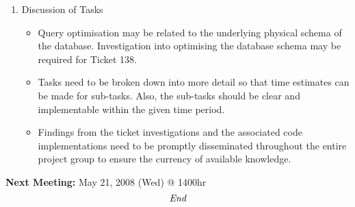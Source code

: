 \documentclass[10pt, a4]{article}
\begin{document}
\begin{enumerate}
\begin{itemize}
  \end{itemize}
\item Discussion of Tasks
  \begin{itemize}
  \item Query optimisation may be related to the underlying physical schema of the database. Investigation into optimising the database schema may be required for Ticket 138.
  \item Tasks need to be broken down into more detail so that time estimates can be made for sub-tasks. Also, the sub-tasks should be clear and implementable within the given time period.
  \item Findings from the ticket investigations and the associated code implementations need to be promptly disseminated throughout the entire project group to ensure the currency of available knowledge.
  \end{itemize}
\end{enumerate}

\textbf{Next Meeting:} May 21, 2008 (Wed) @ 1400hr\\

\[\emph{End}\]
 
\end{document}
